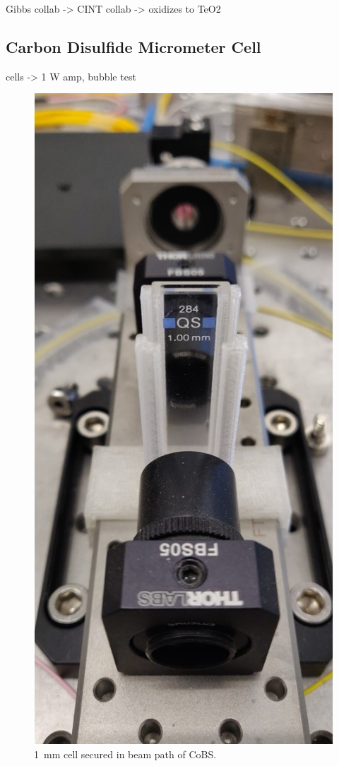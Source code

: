 Gibbs collab -> CINT collab -> oxidizes to TeO2



\subsection{Carbon Disulfide Micrometer Cell}
\label{subsec:Raman:Target:CS2Cells}

cells -> 1 W amp, bubble test

\begin{figure}[t]
  \centering
  \includegraphics[width=\textwidth]{figs/4-Raman/1mmCS2.jpg}
  \caption{\SI{1}{\milli\meter}  cell secured in beam path of \acl{CoBS}.}
  \label{fig:Raman:1mmCS2}
\end{figure}

